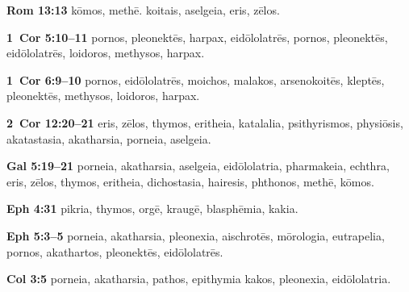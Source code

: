 \textbf{Rom 13:13} \gls{kōmos}, \gls{methē}. \gls{koitais}, \gls{aselgeia}, \gls{eris}, \gls{zēlos}. 

\textbf{1~Cor 5:10--11} \gls{pornos}, \gls{pleonektēs}, \gls{harpax}, \gls{eidōlolatrēs}, %
\gls{pornos}, \gls{pleonektēs}, \gls{eidōlolatrēs}, \gls{loidoros}, \gls{methysos}, \gls{harpax}. %
 
\textbf{1~Cor 6:9--10}  \gls{pornos}, \gls{eidōlolatrēs}, \gls{moichos}, \gls{malakos}, \gls{arsenokoitēs}, %
\gls{kleptēs}, \gls{pleonektēs}, \gls{methysos},  \gls{loidoros}, \gls{harpax}. %

\textbf{2~Cor 12:20--21} \gls{eris}, \gls{zēlos}, \gls{thymos}, \gls{eritheia}, \gls{katalalia}, \gls{psithyrismos}, \gls{physiōsis}, \gls{akatastasia}, %
\gls{akatharsia}, \gls{porneia}, \gls{aselgeia}. %

\textbf{Gal 5:19--21} \gls{porneia}, \gls{akatharsia}, \gls{aselgeia}, %
\gls{eidōlolatria}, \gls{pharmakeia}, \gls{echthra}, \gls{eris}, \gls{zēlos}, \gls{thymos}, \gls{eritheia}, \gls{dichostasia}, \gls{hairesis}, %
\gls{phthonos}, \gls{methē}, \gls{kōmos}. %

\textbf{Eph 4:31} \gls{pikria}, \gls{thymos}, \gls{orgē}, \gls{kraugē}, \gls{blasphēmia}, \gls{kakia}. %

\textbf{Eph 5:3--5} \gls{porneia}, \gls{akatharsia}, \gls{pleonexia}, %
\gls{aischrotēs}, \gls{mōrologia}, \gls{eutrapelia}, %
\gls{pornos}, \gls{akathartos}, \gls{pleonektēs}, \gls{eidōlolatrēs}. %

\textbf{Col 3:5} \gls{porneia}, \gls{akatharsia}, \gls{pathos}, \gls{epithymia kakos}, \gls{pleonexia}, \gls{eidōlolatria}. %

